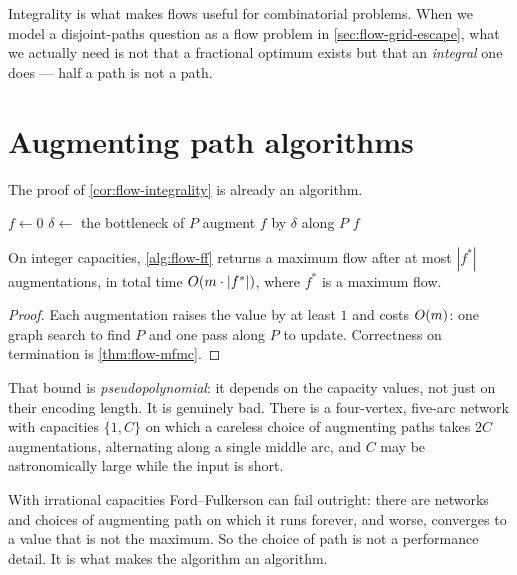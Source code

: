 Integrality is what makes flows useful for combinatorial problems. When we
model a disjoint-paths question as a flow problem in \cref{sec:flow-grid-escape},
what we actually need is not that a fractional optimum exists but that an
\emph{integral} one does --- half a path is not a path.

\section{Augmenting path algorithms}
\label{sec:flow-algorithms}

The proof of \cref{cor:flow-integrality} is already an algorithm.

\begin{algorithm}[ht]
\caption{Ford--Fulkerson}
\label{alg:flow-ff}
\begin{algorithmic}[1]
  \State $f \gets 0$
     \State $\delta \gets$ the bottleneck of $P$
     \State augment $f$ by $\delta$ along $P$
  \EndWhile
  \State \Return $f$
\end{algorithmic}
\end{algorithm}

\begin{theorem}\label{thm:flow-ff}
On integer capacities, \cref{alg:flow-ff} returns a maximum flow after at most
$|f^\ast|$ augmentations, in total time $O\!\left(m \cdot |f^\ast|\right)$, where
$f^\ast$ is a maximum flow.
\end{theorem}

\begin{proof}
Each augmentation raises the value by at least $1$ and costs $O\!\left(m\right)$: one
graph search to find $P$ and one pass along $P$ to update. Correctness on
termination is \cref{thm:flow-mfmc}.
\end{proof}

That bound is \emph{pseudopolynomial}: it depends on the capacity values, not
just on their encoding length. It is genuinely bad. There is a four-vertex, five-arc
network with capacities $\{1, C\}$ on which a careless choice of augmenting
paths takes $2C$ augmentations, alternating along a single middle arc, and $C$
may be astronomically large while the input is short.

\begin{remark}
With irrational capacities Ford--Fulkerson can fail outright: there are
networks and choices of augmenting path on which it runs forever, and worse,
converges to a value that is not the maximum. So the choice of path is not a
performance detail. It is what makes the algorithm an algorithm.
\end{remark}

